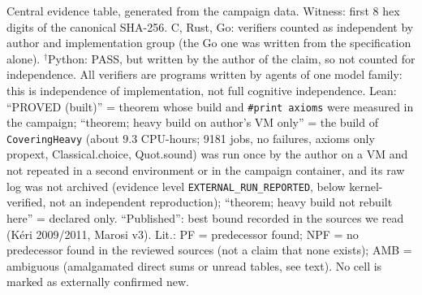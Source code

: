\begin{table}[ht]
\caption{Central evidence table, generated from the campaign data. Witness: first 8 hex digits of the canonical SHA-256. C, Rust, Go: verifiers counted as independent by author and implementation group (the Go one was written from the specification alone). $^\dagger$Python: PASS, but written by the author of the claim, so not counted for independence. All verifiers are programs written by agents of one model family: this is independence of implementation, not full cognitive independence. Lean: ``PROVED (built)'' = theorem whose build and \texttt{\#print axioms} were measured in the campaign; ``theorem; heavy build on author's VM only'' = the build of \texttt{CoveringHeavy} (about $9.3$ CPU-hours; 9181 jobs, no failures, axioms only propext, Classical.choice, Quot.sound) was run once by the author on a VM and not repeated in a second environment or in the campaign container, and its raw log was not archived (evidence level \texttt{EXTERNAL\_RUN\_REPORTED}, below kernel-verified, not an independent reproduction); ``theorem; heavy build not rebuilt here'' = declared only. ``Published'': best bound recorded in the sources we read (K\'eri 2009/2011, Marosi v3). Lit.: PF = predecessor found; NPF = no predecessor found in the reviewed sources (not a claim that none exists); AMB = ambiguous (amalgamated direct sums or unread tables, see text). No cell is marked as externally confirmed new.}
\label{tab:evidence}
\end{table}
